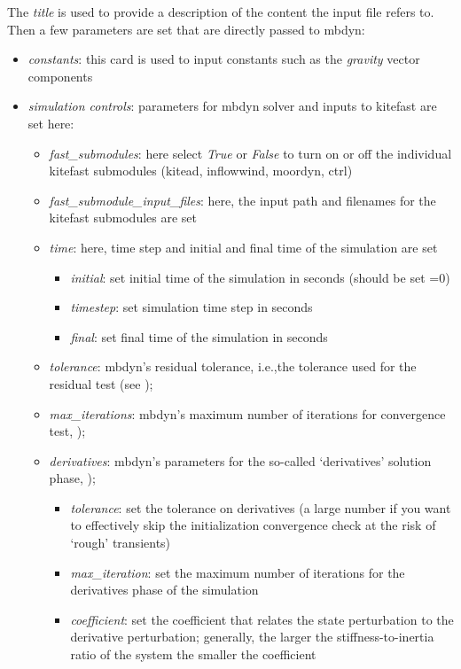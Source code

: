 \documentclass[report]{nrel}
\def\ie{i.e., }
\def\ie{i.e.,}
\begin{document}
The \emph{title} is used to provide a description of the content the input file refers to.
Then a few parameters are set that are directly passed to \gls{mbdyn}:
\begin{itemize}
	\item \emph{constants}: this card is used to input constants such as the \emph{gravity} vector components
%	
	\item \emph{simulation controls}: parameters for \gls{mbdyn} solver and inputs to \gls{kitefast} are set here:
%
	\begin{itemize}
		\item \emph{fast\_submodules}: here select \emph{True} or \emph{False} to turn on or off the individual \gls{kitefast} submodules (\gls{kitead}, \gls{inflowwind}, \gls{moordyn}, \gls{ctrl})
		\item \emph{fast\_submodule\_input\_files}: here, the input path and filenames for the \gls{kitefast} submodules are set
		\item \emph{time}: here, time step and initial and final time of the simulation are set
		\begin{itemize}
			\item \emph{initial}: set initial time of the simulation in seconds (should be set =0)
			\item \emph{timestep}: set simulation time step in seconds
			\item \emph{final}: set final time of the simulation in seconds
		\end{itemize}
		\item \emph{tolerance}: \gls{mbdyn}'s residual tolerance, \ie the tolerance used for the residual test (see \cite{masarati2017});
		\item \emph{max\_iterations}: \gls{mbdyn}'s maximum number of iterations for convergence test, \citep[see][]{masarati2017});
		\item \emph{derivatives}: \gls{mbdyn}'s parameters for the so-called `derivatives' solution phase, \citep[see][]{masarati2017});
		\begin{itemize}
			\item \emph{tolerance}: set the tolerance on derivatives (a large number if you want to effectively skip the initialization convergence check at the risk of `rough' transients)
			\item \emph{max\_iteration}: set the maximum number of iterations for the derivatives phase of the simulation
			\item \emph{coefficient}: set the coefficient that relates the state perturbation to the derivative perturbation; generally, the larger the stiffness-to-inertia ratio of the system the smaller the coefficient

\end{itemize}
\end{itemize}
\end{itemize}
\end{document}
